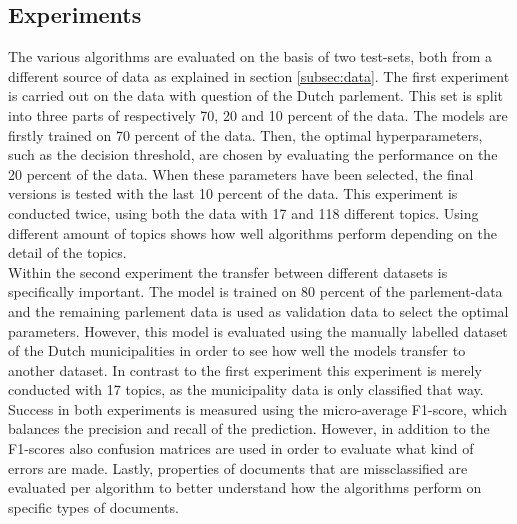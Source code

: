 \subsection{Experiments}
The various algorithms are evaluated on the basis of two test-sets, both from a different source of data as explained in section \ref{subsec:data}. The first experiment is carried out on the data with question of the Dutch parlement. This set is split into three parts of respectively 70, 20 and 10 percent of the data. The models are firstly trained on 70 percent of the data. Then, the optimal hyperparameters, such as the decision threshold, are chosen by evaluating the performance on the 20 percent of the data. When these parameters have been selected, the final versions is tested with the last 10 percent of the data. This experiment is conducted twice, using both the data with 17 and 118 different topics. Using different amount of topics shows how well algorithms perform depending on the detail of the topics.\\
Within the second experiment the transfer between different datasets is specifically important. The model is trained on 80 percent of the parlement-data and the remaining parlement data is used as validation data to select the optimal parameters. However, this model is evaluated using the manually labelled dataset of the Dutch municipalities in order to see how well the models transfer to another dataset. In contrast to the first experiment this experiment is merely conducted with 17 topics, as the municipality data is only classified that way.\\
Success in both experiments is measured using the micro-average F1-score, which balances the precision and recall of the prediction. However, in addition to the F1-scores also confusion matrices are used in order to evaluate what kind of errors are made. Lastly, properties of documents that are missclassified are evaluated per algorithm to better understand how the algorithms perform on specific types of documents. 


%
%
%
%
%
%
%
